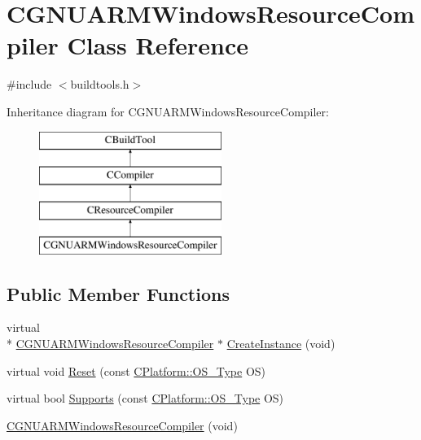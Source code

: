 \hypertarget{classCGNUARMWindowsResourceCompiler}{\section{C\-G\-N\-U\-A\-R\-M\-Windows\-Resource\-Compiler Class Reference}
\label{classCGNUARMWindowsResourceCompiler}
}


{\ttfamily \#include $<$buildtools.\-h$>$}

Inheritance diagram for C\-G\-N\-U\-A\-R\-M\-Windows\-Resource\-Compiler\-:\begin{figure}[H]
\begin{center}
\leavevmode
\includegraphics[height=4.000000cm]{d6/d48/classCGNUARMWindowsResourceCompiler}
\end{center}
\end{figure}
\subsection*{Public Member Functions}
\begin{DoxyCompactItemize}
\item 
virtual \\*
\hyperlink{classCGNUARMWindowsResourceCompiler}{C\-G\-N\-U\-A\-R\-M\-Windows\-Resource\-Compiler} $\ast$ \hyperlink{classCGNUARMWindowsResourceCompiler_a8da0eff0b561e69f2e2178965cd69253}{Create\-Instance} (void)
\item 
virtual void \hyperlink{classCGNUARMWindowsResourceCompiler_a0eae18d396f5bfc5ffcd76af42b8d093}{Reset} (const \hyperlink{classCPlatform_a2fb735c63c53052f79629e338bb0f535}{C\-Platform\-::\-O\-S\-\_\-\-Type} O\-S)
\item 
virtual bool \hyperlink{classCGNUARMWindowsResourceCompiler_abffeeed1b3f8b6482c231c7349098f0c}{Supports} (const \hyperlink{classCPlatform_a2fb735c63c53052f79629e338bb0f535}{C\-Platform\-::\-O\-S\-\_\-\-Type} O\-S)
\item 
\hyperlink{classCGNUARMWindowsResourceCompiler_aacc47687b1ea60b470580cfa7de868e2}{C\-G\-N\-U\-A\-R\-M\-Windows\-Resource\-Compiler} (void)
\end{DoxyCompactItemize}
